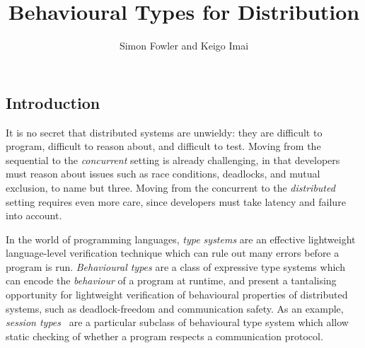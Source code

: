 \documentclass[
graybox,
envcountchap
]{svmult}
\begin{document}
\begin{bibunit}

	\title*{Behavioural Types for Distribution}
	\author{Simon Fowler and Keigo Imai}

	\maketitle

  \section{Introduction}

  It is no secret that distributed systems are unwieldy: they are difficult to
  program, difficult to reason about, and difficult to test. Moving from the
  sequential to the \emph{concurrent} setting is already challenging, in that
  developers must reason about issues such as race conditions, deadlocks, and
  mutual exclusion, to name but three. Moving from
  the concurrent to the \emph{distributed} setting requires even more care,
  since developers must take latency and failure into account.

  In the world of programming languages, \emph{type systems} are an effective
  lightweight language-level verification technique which can rule out many
  errors before a program is run. \emph{Behavioural types} are a class of
  expressive type systems which can encode the \emph{behaviour} of a program at
  runtime, and present a tantalising opportunity for lightweight verification of
  behavioural properties of distributed systems, such as deadlock-freedom and
  communication safety. As an example, \emph{session
  types}~\cite{Honda93:dyadic, HondaVK98:primitives} are a particular
  subclass of behavioural type system which allow static checking of whether a
  program respects a communication protocol.


\end{bibunit}
\end{document}

